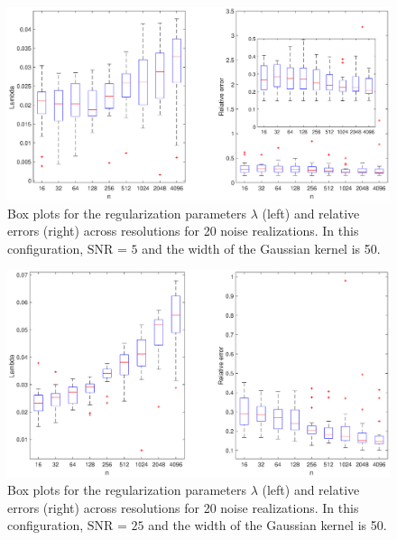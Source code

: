 \documentclass[12pt]{article}
\newcommand{\regparam}{\lambda}
\begin{document}
\begin{figure}
	\centerline{\includegraphics[scale = 0.45]{Figures/BothBoxes1D_F2_S05_W100_R20.eps}}
\caption{Box plots for the regularization parameters $\regparam$ (left) and relative errors (right) across resolutions for 20 noise realizations. In this configuration, $\text{SNR = 5}$ and the width of the Gaussian kernel is 50.}
\end{figure}

\begin{figure}
	\centerline{\includegraphics[scale = 0.45]{Figures/BothBoxes1D_F2_S05_W200_R20.eps}}
\caption{Box plots for the regularization parameters $\regparam$ (left) and relative errors (right) across resolutions for 20 noise realizations. In this configuration, $\text{SNR = 25}$ and the width of the Gaussian kernel is 50.}
\end{figure}
\end{document}
